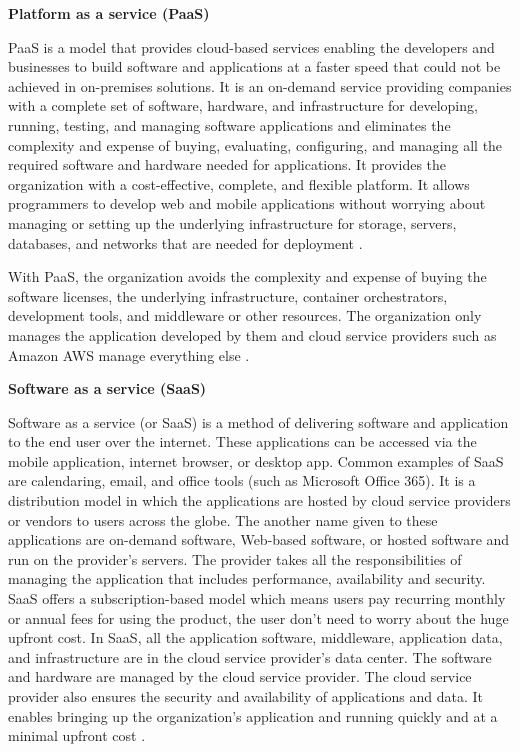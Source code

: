 \clearpage
\textbf{Platform as a service (PaaS)}
\par PaaS is a model that provides cloud-based services
enabling the developers and businesses to build software
and applications at a faster speed that could not be
achieved in on-premises solutions.
It is an on-demand service providing companies with a
complete set of software, hardware, and infrastructure for
developing, running, testing, and managing software
applications and eliminates the complexity and expense of
buying, evaluating, configuring, and managing all the
required software and hardware needed for applications.
It provides the organization with a cost-effective,
complete, and flexible platform.
It allows programmers to develop web and mobile
applications without worrying about managing or setting up the underlying infrastructure for storage, servers, databases, and networks that are needed for deployment \cite{15}.


\par With PaaS, the organization avoids the complexity and expense of buying the software licenses, the underlying infrastructure, container orchestrators, development tools, and middleware or other resources.
The organization only manages the application developed
by them and cloud service providers such as Amazon AWS
manage everything else \cite{15}.\\

\hfill \break

\textbf{Software as a service (SaaS)}
\par Software as a service (or SaaS) is a method of delivering software and application to the end user over the internet.
These applications can be accessed via the
mobile application, internet browser, or desktop app.
Common examples of SaaS are calendaring, email, and office tools (such as Microsoft Office 365).
It is a distribution model in which the applications are hosted by cloud service providers or vendors to users across the globe.
The another name given to these applications are
on-demand
software, Web-based software, or hosted software and run
on the provider's servers.
The provider takes all the responsibilities of managing the application that includes performance, availability and security.
SaaS offers a subscription-based model
which
means users pay recurring monthly or annual fees for
using the product, the user don’t need to worry
about the huge
upfront cost.
In SaaS, all the
application software, middleware, application data, and infrastructure are in the cloud service provider’s data center.
The software and hardware are managed by the cloud
service provider.
The cloud service provider also ensures the security and availability of applications and data.
It enables bringing up the organization’s application and
running quickly and at a minimal upfront cost \cite{15}.

